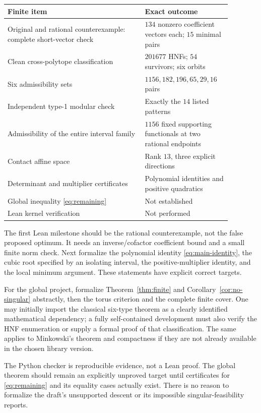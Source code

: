 \documentclass[11pt,reqno]{amsart}
\theoremstyle{definition}
\begin{document}
\begin{center}
\begin{tabular}{p{0.56\linewidth}p{0.32\linewidth}}
\toprule
Finite item & Exact outcome\\\midrule
Original and rational counterexample: complete short-vector check
& $134$ nonzero coefficient vectors each; $15$ minimal pairs\\
Clean cross-polytope classification
& $201677$ HNFs; $54$ survivors; six orbits\\
Six admissibility sets
& $1156,182,196,65,29,16$ pairs\\
Independent type-1 modular check
& Exactly the $14$ listed patterns\\
Admissibility of the entire interval family
& $1156$ fixed supporting functionals at two rational endpoints\\
Contact affine space
& Rank $13$, three explicit directions\\
Determinant and multiplier certificates
& Polynomial identities and positive quadratics\\
Global inequality \eqref{eq:remaining}
& Not established\\
Lean kernel verification
& Not performed\\\bottomrule
\end{tabular}
\end{center}

The first Lean milestone should be the rational counterexample, not
the false proposed optimum. It needs an inverse/cofactor coefficient
bound and a small finite norm check. Next formalize the polynomial
identity \eqref{eq:main-identity}, the cubic root specified by an
isolating interval, the positive-multiplier identity, and the local
minimum argument. These statements have explicit correct targets.

For the global project, formalize Theorem~\ref{thm:finite} and
Corollary~\ref{cor:no-singular} abstractly, then the torus criterion and
the complete finite cover. One may initially import the classical
six-type theorem as a clearly identified mathematical dependency; a
fully self-contained development must also verify the HNF enumeration
or supply a formal proof of that classification. The same applies to
Minkowski's theorem and compactness if they are not already available
in the chosen library version.

The Python checker is reproducible evidence, not a Lean proof. The
global theorem should remain an explicitly unproved target until
certificates for \eqref{eq:remaining} and its equality cases actually
exist. There is no reason to formalize the draft's unsupported descent
or its impossible singular-feasibility reports.
\end{document}
